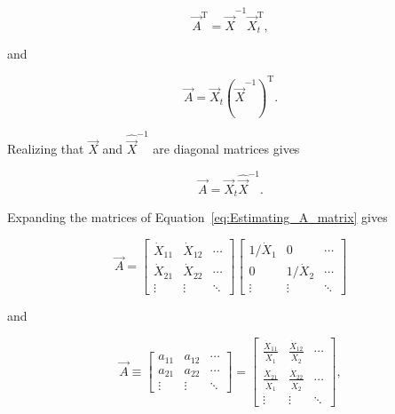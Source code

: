 \begin{equation}\label{eq:Xdifference1Proof-9}
	\vec{A}^\mathrm{T} 
	= \hat{\vec{X}}^{-1} 
	\vec{X}_{t}^\mathrm{T},
\end{equation}

\noindent{}and

\begin{equation}\label{eq:Xdifference1Proof-10}
	\vec{A} 
	= \vec{X}_{t}
	{\left( {\hat{\vec{X}}^{-1}} \right)}^\mathrm{T}.
\end{equation}

\noindent{}Realizing that $\hat{\vec{X}}$ and $\hat{\vec{X}}^{-1}$
are diagonal matrices gives

\begin{equation}\label{eq:Estimating_A_matrix} 
	\vec{A} 
	= \vec{X}_{t}
	\hat{\vec{X}}^{-1}.
\end{equation}

\noindent{}Expanding the matrices of Equation~\ref{eq:Estimating_A_matrix} gives

\begin{equation}
	\vec{A}
	=
	\begin{bmatrix}
		\dot{X}_{11} & \dot{X}_{12} & \cdots \\
		\dot{X}_{21} & \dot{X}_{22} & \cdots \\
		\vdots       & \vdots       & \ddots
	\end{bmatrix}
	\begin{bmatrix}
		1/\dot{X}_{1} & 0             & \cdots \\
		0             & 1/\dot{X}_{2} & \cdots \\
		\vdots        & \vdots        & \ddots
	\end{bmatrix}
\end{equation}

\noindent{}and

\begin{equation}
	\vec{A}
	\equiv
	\begin{bmatrix}
		a_{11} & a_{12} & \cdots \\
		a_{21} & a_{22} & \cdots \\
		\vdots & \vdots & \ddots
	\end{bmatrix}
	=
	\begin{bmatrix}
		\frac{\dot{X}_{11}}{\dot{X}_{1}} & \frac{\dot{X}_{12}}{\dot{X}_{2}} & \cdots \\
		\frac{\dot{X}_{21}}{\dot{X}_{1}} & \frac{\dot{X}_{22}}{\dot{X}_{2}} & \cdots \\
		\vdots       & \vdots       & \ddots
	\end{bmatrix},
\end{equation}

